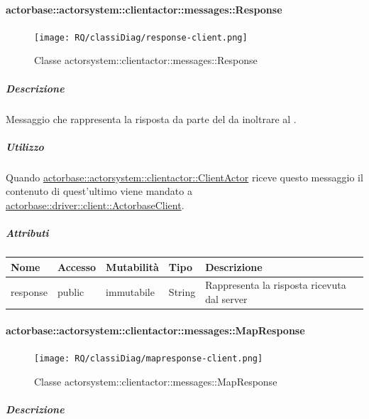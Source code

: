 \documentclass{scalatekids-article}
\begin{document}
\paragraph{actorbase::actorsystem::clientactor::messages::Response}
\label{sec:actorbase::actorsystem::clientactor::messages::Response}

\begin{figure}[H]
   \begin{center}
     \texttt{[image: RQ/classiDiag/response-client.png]}
     \caption{Classe actorsystem::clientactor::messages::Response}
   \end{center}
 \end{figure}

\subparagraph{Descrizione}

Messaggio che rappresenta la risposta da parte del  da inoltrare
al .

\subparagraph{Utilizzo}

Quando \hyperref[sec:actorbase::actorsystem::clientactor::ClientActor]{actorbase::actorsystem::clientactor::ClientActor}
riceve questo messaggio il contenuto di quest'ultimo viene
mandato a \hyperref[sec:actorbase::driver::client::ActorbaseClient]{actorbase::driver::\allowbreak{}client::\allowbreak{}ActorbaseClient}.

\subparagraph{Attributi}
\begin{tabular}{| p{3cm} | p{1.5cm} | p{2cm} | p{2cm} | p{8.5cm} |}
  \hline
  Nome & Accesso & Mutabilità & Tipo & Descrizione\\
  \hline
  response & public & immutabile & String & Rappresenta la risposta ricevuta dal server \\
  \hline
\end{tabular}

\paragraph{actorbase::actorsystem::clientactor::messages::MapResponse}
\label{sec:actorbase::actorsystem::clientactor::messages::MapResponse}

\begin{figure}[H]
   \begin{center}
     \texttt{[image: RQ/classiDiag/mapresponse-client.png]}
     \caption{Classe actorsystem::clientactor::messages::MapResponse}
   \end{center}
 \end{figure}

\subparagraph{Descrizione}
\end{document}
